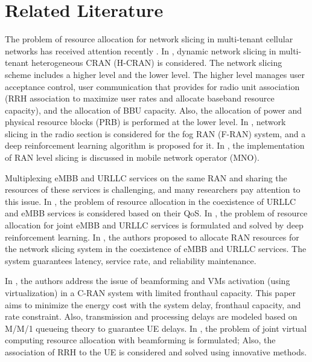 \documentclass[lettersize,journal]{IEEEtran}
\begin{document}
\section{Related Literature}\label{RL}
The problem of resource allocation for network slicing in multi-tenant cellular networks has received attention recently \cite{feng2020dynamic,lee2018dynamic,lee2016new}.
In \cite{lee2018dynamic}, dynamic network slicing in multi-tenant heterogeneous CRAN (H-CRAN) is considered. The network slicing scheme includes a higher level and the lower level. The higher level manages user acceptance control, user communication that provides for radio unit association (RRH association to maximize user rates and allocate baseband resource capacity), and the allocation of BBU capacity. Also, the allocation of power and physical resource blocks (PRB) is performed at the lower level.
In \cite{xiang2020realization}, network slicing in the radio section is considered for the fog RAN (F-RAN) system, and a deep reinforcement learning algorithm is proposed for it. In \cite{elayoubi20195g,d2020toward}, the implementation of RAN level slicing is discussed in mobile network operator (MNO).

Multiplexing eMBB and URLLC services on the same RAN and sharing the resources of these services is challenging, and many researchers pay attention to this issue.
In \cite{setayesh2020joint,yang2020should,saggese2021power}, the problem of resource allocation in the coexistence of URLLC and eMBB services is considered based on their QoS.
In \cite{alsenwi2021intelligent}, the problem of resource allocation for joint eMBB and URLLC services is formulated and solved by deep reinforcement learning.
 In \cite{korrai2020ran}, the authors proposed to allocate RAN resources for the network slicing system in the coexistence of eMBB and URLLC services. The system guarantees latency, service rate, and reliability maintenance.
 
In \cite{SystemCostMinimization,guo2016exploiting}, the authors address the issue of beamforming and VMs activation (using virtualization) in a C-RAN system with limited fronthaul capacity.
This paper aims to minimize the energy cost with the system delay, fronthaul capacity, and rate constraint.
Also, transmission and processing delays are modeled based on M/M/1 queueing theory to guarantee UE delays.
In \cite{luong2018joint,luong2018novel}, the problem of joint virtual computing resource allocation with beamforming is formulated; Also, the association of RRH to the UE is considered and solved using innovative methods.
\end{document}
